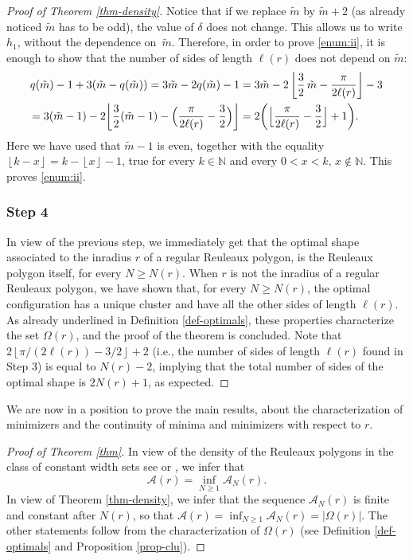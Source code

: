 \documentclass[11pt]{article}
\newcommand{\ie}{i.e.,\xspace}
\numberwithin{equation}{section}
\let\mathcal\mathscr
\theoremstyle{plain}
\theoremstyle{definition}
\newcommand\A{\mathcal A}
\begin{document}
\begin{proof}[Proof of Theorem \ref{thm-density}]
Notice that if we replace $\tilde{m}$ by $\tilde{m}+2$ (as already noticed $\tilde{m}$ has to be odd), the value of $\delta$ does not change. This allows us to write $h_1$, without the dependence on~$\tilde{m}$. Therefore, in order to prove \eqref{enum:ii}, it is enough to show that the number of sides of length $\ell(r)$ does not depend on $\tilde{m}$:
\begin{align*}
q (\tilde{m})-1+ 3 (\tilde{m}-q(\tilde{m})) = 3 \tilde{m} - 2 q(\tilde{m})-1 &= 3 \tilde{m} - 2 \left\lfloor \frac32\, \tilde{m} - \frac{\pi}{2\ell(r)} \right\rfloor - 3
\\ = 3 (\tilde{m}-1) - 2 \biggl\lfloor \frac32 (\tilde{m}-1) - \Bigl(\frac{\pi}{2\ell(r)} - \frac32 \Bigr) \biggr\rfloor &= 2 \biggl( \Bigl\lfloor \frac{\pi}{2\ell(r)} - \frac32 \Bigr\rfloor+ 1\biggr).
\end{align*}
Here we have used that $\tilde{m}-1$ is even, together with the equality $\left\lfloor k - x\right\rfloor= k -\left\lfloor x \right\rfloor - 1$, true for every $k\in \mathbb N$ and every $0<x<k$, $x\notin \mathbb N$. This proves \eqref{enum:ii}.

\subsubsection*{Step 4} In view of the previous step, we immediately get that the optimal shape associated to the inradius $r$ of a regular Reuleaux polygon, is the Reuleaux polygon itself, for every $N\geq N(r)$. When $r$ is not the inradius of a regular Reuleaux polygon, we have shown that, for every $N\geq N(r)$, the optimal configuration has a unique cluster and have all the other sides of length $\ell(r)$. As already underlined in Definition \ref{def-optimals}, these properties characterize the set $ \Omega(r)$, and the proof of the theorem is concluded. Note that $2 \left\lfloor \pi/(2\ell(r))- 3/2\right\rfloor+2$ (\ie the number of sides of length $\ell(r)$ found in Step 3) is equal to $N(r)-2$, implying that the total number of sides of the optimal shape is $2N(r)+1$, as expected.
\end{proof}

We are now in a position to prove the main results, about the characterization of minimizers and the continuity of minima and minimizers with respect to $r$.
\begin{proof}[Proof of Theorem \ref{thm}]
In view of the density of the Reuleaux polygons in the class of constant width sets see \cite{BF} or \cite{Buc}, we infer that
\[
\A(r)=\inf_{ {N\geq 1}} \A_N(r).
\]
In view of Theorem \ref{thm-density}, we infer that the sequence $\A_N(r)$ is finite and constant after $N(r)$, so that $\A(r)=\inf_{ {N\geq 1}}\A_N(r)=|\Omega(r)|$. The other statements follow from the characterization of $\Omega(r)$ (see Definition \ref{def-optimals} and Proposition \ref{prop-clu}).
\end{proof}
\end{document}
